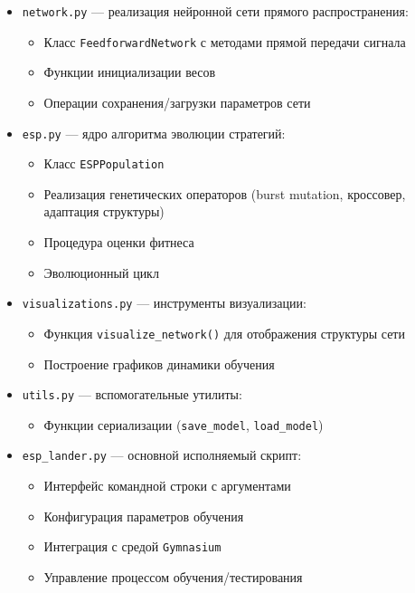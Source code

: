 \documentclass[a4paper,12pt]{article}
\begin{document}
\begin{itemize}
	\item \texttt{network.py} --- реализация нейронной сети прямого распространения:
	\begin{itemize}
		\item Класс \texttt{FeedforwardNetwork} с методами прямой передачи сигнала
		\item Функции инициализации весов
		\item Операции сохранения/загрузки параметров сети
	\end{itemize}
	
	\item \texttt{esp.py} --- ядро алгоритма эволюции стратегий:
	\begin{itemize}
		\item Класс \texttt{ESPPopulation}
		\item Реализация генетических операторов (burst mutation, кроссовер, адаптация структуры)
		\item Процедура оценки фитнеса
		\item Эволюционный цикл
	\end{itemize}
	
	\item \texttt{visualizations.py} --- инструменты визуализации:
	\begin{itemize}
		\item Функция \texttt{visualize\_network()} для отображения структуры сети
		\item Построение графиков динамики обучения
	\end{itemize}
	
	\item \texttt{utils.py} --- вспомогательные утилиты:
	\begin{itemize}
		\item Функции сериализации (\texttt{save\_model}, \texttt{load\_model})
	\end{itemize}
	
	\item \texttt{esp\_lander.py} --- основной исполняемый скрипт:
	\begin{itemize}
		\item Интерфейс командной строки с аргументами
		\item Конфигурация параметров обучения
		\item Интеграция с средой \texttt{Gymnasium}
		\item Управление процессом обучения/тестирования
	\end{itemize}
	

\end{itemize}
\end{document}
